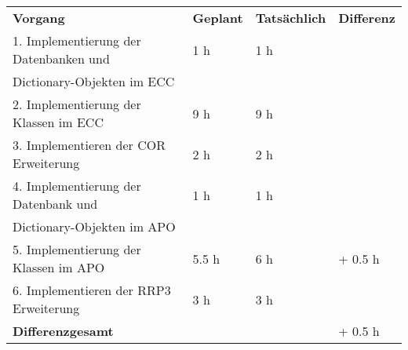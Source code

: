 \begin{tabu}{llll}
\rowfont{\bfseries\leavevmode\color{headingfont}}\textbf{Vorgang} & \textbf{Geplant} & \textbf{Tatsächlich} & \textbf{Differenz} \\
1. Implementierung der Datenbanken und & 1 h & 1 h & \\ 
Dictionary-Objekten im ECC & & & \\
2. Implementierung der Klassen im ECC & 9 h & 9 h & \\
3.  Implementieren der COR Erweiterung & 2 h & 2 h & \\
4. Implementierung der Datenbank und & 1 h & 1 h & \\ 
Dictionary-Objekten im APO & & & \\
5. Implementierung der Klassen im APO & 5.5 h & 6 h & + 0.5 h \\
6.  Implementieren der RRP3 Erweiterung & 3 h & 3 h & \\
\hline
\hline
{}\textbf{Differenzgesamt} & & & + 0.5 h \\
\end{tabu}